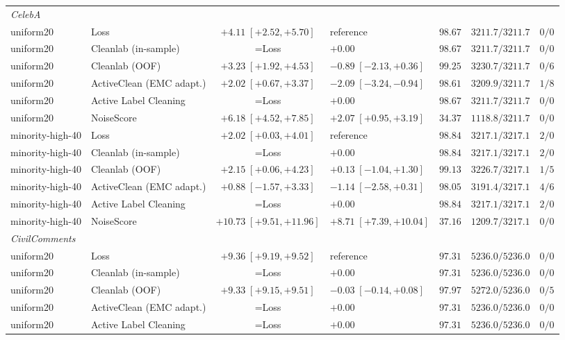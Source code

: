 \documentclass{article}
\begin{document}
\begin{table}[H]
{\begin{tabular}{llclccc}
\midrule
\multicolumn{6}{l}{\emph{CelebA}} \\
uniform20 & Loss & $+4.11\;[+2.52,+5.70]$ & reference & $98.67$ & $3211.7/3211.7$ & $0/0$ \\
uniform20 & Cleanlab (in-sample) & =Loss & $+0.00$ & $98.67$ & $3211.7/3211.7$ & $0/0$ \\
uniform20 & Cleanlab (OOF) & $+3.23\;[+1.92,+4.53]$ & $-0.89\;[-2.13,+0.36]$ & $99.25$ & $3230.7/3211.7$ & $0/6$ \\
uniform20 & ActiveClean (EMC adapt.) & $+2.02\;[+0.67,+3.37]$ & $-2.09\;[-3.24,-0.94]$ & $98.61$ & $3209.9/3211.7$ & $1/8$ \\
uniform20 & Active Label Cleaning & =Loss & $+0.00$ & $98.67$ & $3211.7/3211.7$ & $0/0$ \\
uniform20 & NoiseScore & $+6.18\;[+4.52,+7.85]$ & $+2.07\;[+0.95,+3.19]$ & $34.37$ & $1118.8/3211.7$ & $0/0$ \\
minority-high-40 & Loss & $+2.02\;[+0.03,+4.01]$ & reference & $98.84$ & $3217.1/3217.1$ & $2/0$ \\
minority-high-40 & Cleanlab (in-sample) & =Loss & $+0.00$ & $98.84$ & $3217.1/3217.1$ & $2/0$ \\
minority-high-40 & Cleanlab (OOF) & $+2.15\;[+0.06,+4.23]$ & $+0.13\;[-1.04,+1.30]$ & $99.13$ & $3226.7/3217.1$ & $1/5$ \\
minority-high-40 & ActiveClean (EMC adapt.) & $+0.88\;[-1.57,+3.33]$ & $-1.14\;[-2.58,+0.31]$ & $98.05$ & $3191.4/3217.1$ & $4/6$ \\
minority-high-40 & Active Label Cleaning & =Loss & $+0.00$ & $98.84$ & $3217.1/3217.1$ & $2/0$ \\
minority-high-40 & NoiseScore & $+10.73\;[+9.51,+11.96]$ & $+8.71\;[+7.39,+10.04]$ & $37.16$ & $1209.7/3217.1$ & $0/0$ \\
\midrule
\multicolumn{6}{l}{\emph{CivilComments}} \\
uniform20 & Loss & $+9.36\;[+9.19,+9.52]$ & reference & $97.31$ & $5236.0/5236.0$ & $0/0$ \\
uniform20 & Cleanlab (in-sample) & =Loss & $+0.00$ & $97.31$ & $5236.0/5236.0$ & $0/0$ \\
uniform20 & Cleanlab (OOF) & $+9.33\;[+9.15,+9.51]$ & $-0.03\;[-0.14,+0.08]$ & $97.97$ & $5272.0/5236.0$ & $0/5$ \\
uniform20 & ActiveClean (EMC adapt.) & =Loss & $+0.00$ & $97.31$ & $5236.0/5236.0$ & $0/0$ \\
uniform20 & Active Label Cleaning & =Loss & $+0.00$ & $97.31$ & $5236.0/5236.0$ & $0/0$ \\

\end{tabular}}
\end{table}
\end{document}
